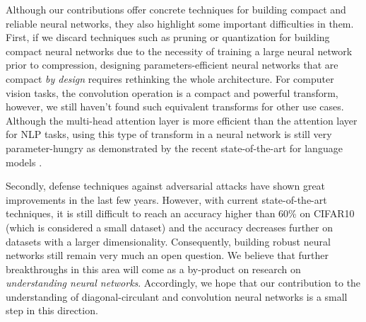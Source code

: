 Although our contributions offer concrete techniques for building compact and reliable neural networks, they also highlight some important difficulties in them.
First, if we discard techniques such as pruning or quantization for building compact neural networks due to the necessity of training a large neural network prior to compression, designing parameters-efficient neural networks that are compact \emph{by design} requires rethinking the whole architecture.
For computer vision tasks, the convolution operation is a compact and powerful transform, however, we still haven't found such equivalent transforms for other use cases.
Although the multi-head attention layer is more efficient than the attention layer for NLP tasks, using this type of transform in a neural network is still very parameter-hungry as demonstrated by the recent state-of-the-art for language models \cite{brown2020language}.


Secondly, defense techniques against adversarial attacks have shown great improvements in the last few years.
However, with current state-of-the-art techniques, it is still difficult to reach an accuracy higher than 60\% on CIFAR10 (which is considered a small dataset) and the accuracy decreases further on datasets with a larger dimensionality.
Consequently, building robust neural networks still remain very much an open question.
We believe that further breakthroughs in this area will come as a by-product on research on \emph{understanding neural networks}. 
Accordingly, we hope that our contribution to the understanding of diagonal-circulant and convolution neural networks is a small step in this direction.













